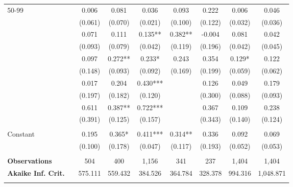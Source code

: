 \begin{tabular*}{\linewidth}{@{\extracolsep{\fill} } llccccccc}
\multirow{2}{*}{\hspace{0.2cm}50{-}99}&&0.006&0.081&0.036&0.093&0.222&0.006&0.046\\%
&&(0.061)&(0.070)&(0.021)&(0.100)&(0.122)&(0.032)&(0.036)\\%
\arrayrulecolor{white}%
\hline%
\arrayrulecolor{white}%
\hline%
\arrayrulecolor{white}%
\hline%
\arrayrulecolor{white}%
\hline%
\arrayrulecolor{white}%
\hline%
\multirow{2}{*}{\hspace{0.2cm}100{-}199}&&0.071&0.111&0.135**&0.382**&{-}0.004&0.081&0.042\\%
&&(0.093)&(0.079)&(0.042)&(0.119)&(0.196)&(0.042)&(0.045)\\%
\arrayrulecolor{white}%
\hline%
\arrayrulecolor{white}%
\hline%
\arrayrulecolor{white}%
\hline%
\arrayrulecolor{white}%
\hline%
\arrayrulecolor{white}%
\hline%
\multirow{2}{*}{\hspace{0.2cm}200{-}299}&&0.097&0.272**&0.233*&0.243&0.354&0.129*&0.122\\%
&&(0.148)&(0.093)&(0.092)&(0.169)&(0.199)&(0.059)&(0.062)\\%
\arrayrulecolor{white}%
\hline%
\arrayrulecolor{white}%
\hline%
\arrayrulecolor{white}%
\hline%
\arrayrulecolor{white}%
\hline%
\arrayrulecolor{white}%
\hline%
\multirow{2}{*}{\hspace{0.2cm}300{-}399}&&0.017&0.204&0.430***&&0.126&0.049&0.179\\%
&&(0.197)&(0.182)&(0.120)&&(0.300)&(0.088)&(0.093)\\%
\arrayrulecolor{white}%
\hline%
\arrayrulecolor{white}%
\hline%
\arrayrulecolor{white}%
\hline%
\arrayrulecolor{white}%
\hline%
\arrayrulecolor{white}%
\hline%
\multirow{2}{*}{\hspace{0.2cm}400+}&&0.611&0.387**&0.722***&&0.367&0.109&0.238\\%
&&(0.391)&(0.125)&(0.157)&&(0.343)&(0.140)&(0.124)\\%
\arrayrulecolor{white}%
\hline%
\arrayrulecolor{white}%
\hline%
\arrayrulecolor{white}%
\hline%
\arrayrulecolor{white}%
\hline%
\arrayrulecolor{white}%
\hline%
&&&&&&&&\\%
\multirow{2}{*}{Constant}&&0.195&0.365*&0.411***&0.314**&0.336&0.092&0.069\\%
&&(0.100)&(0.178)&(0.047)&(0.117)&(0.193)&(0.052)&(0.053)\\%
\arrayrulecolor{white}%
\hline%
\arrayrulecolor{white}%
\hline%
\arrayrulecolor{white}%
\hline%
\arrayrulecolor{white}%
\hline%
\arrayrulecolor{white}%
\hline%
&&&&&&&&\\%
\bfseries Observations&&504&400&1,156&341&237&1,404&1,404\\%
\bfseries Akaike Inf. Crit.&&575.111&559.432&384.526&364.784&328.378&994.316&1,048.871\\%
\arrayrulecolor{white}%
\hline%
\arrayrulecolor{white}%
\hline%
\arrayrulecolor{white}%
\hline%
\arrayrulecolor{white}%
\hline%
\arrayrulecolor{white}%
\hline%
\arrayrulecolor{black}%
\hline%
\end{tabular*}